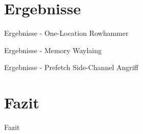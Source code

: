 \documentclass[german,10pt,xcolor=colortbl,compress
]{beamer}
\begin{document}
\section{Ergebnisse}
\begin{frame}{Ergebnisse - One-Location Rowhammer}

\end{frame}
\begin{frame}{Ergebnisse - Memory Waylaing}

\end{frame}
\begin{frame}{Ergebnisse - Prefetch Side-Channel Angriff}

\end{frame}

\section{Fazit}
\begin{frame}{Fazit}

\end{frame}
	
	
\end{document}
